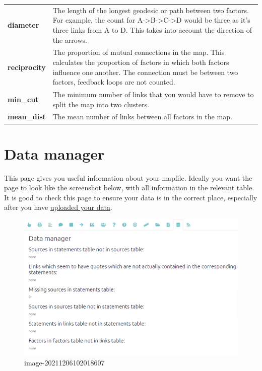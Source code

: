\documentclass[
]{book}
\begin{document}
\begin{longtable}[]{@{}
  >{\raggedright\arraybackslash}p{}
  >{\raggedright\arraybackslash}p{}@{}}
\textbf{diameter} & The length of the longest geodesic or path between two factors. For example, the count for A-\textgreater B-\textgreater C-\textgreater D would be three as it's three links from A to D. This takes into account the direction of the arrows. \\
\textbf{reciprocity} & The proportion of mutual connections in the map. This calculates the proportion of factors in which both factors influence one another. The connection must be between two factors, feedback loops are not counted. \\
\textbf{min\_cut} & The minimum number of links that you would have to remove to split the map into two clusters. \\
\textbf{mean\_dist} & The mean number of links between all factors in the map. \\
\bottomrule
\end{longtable}

\hypertarget{xdata-manager}{%
\chapter{Data manager}\label{xdata-manager}}

This page gives you useful information about your mapfile. Ideally you want the page to look like the screenshot below, with all information in the relevant table. It is good to check this page to ensure your data is in the correct place, especially after you have \protect\hyperlink{ximport}{uploaded your data}.

\begin{figure}
\centering
\includegraphics[width=6.77083in,height=\textheight]{_assets/image-20211206102018607.png}
\caption{image-20211206102018607}
\end{figure}
\end{document}
